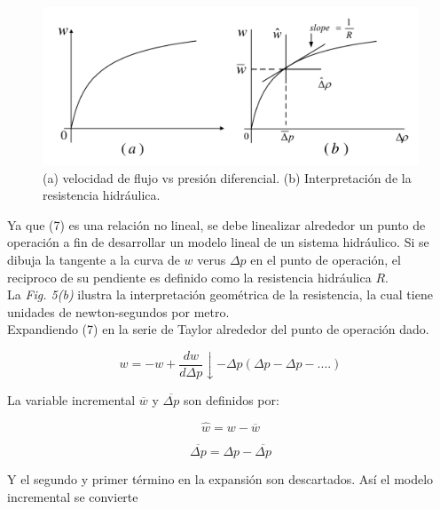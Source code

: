 \documentclass[a4paper,12pt,twoside]{proyectotanquesecci}
\begin{document}
\begin{figure}[h]
\centering
\includegraphics[scale=0.5]{Figura5}
\renewcommand{\figurename}{Fig.}
\caption{(a) velocidad de flujo vs presión diferencial. (b) Interpretación de la resistencia hidráulica.}
\label{(a) velocidad de flujo vs presión diferencial. (b) Interpretación de la resistencia hidráulica.}
\end{figure}

Ya que (7) es una relación no lineal, se debe linealizar alrededor un punto de operación a fin de desarrollar un modelo lineal de un sistema hidráulico.
Si se dibuja la tangente a la curva de $w$ verus $\Delta p$  en el punto de operación, el reciproco de su pendiente es definido como la resistencia hidráulica $R$. \\

La \textit{Fig. 5(b)} ilustra la interpretación geométrica de la resistencia, la cual tiene unidades de newton-segundos por metro.\\

Expandiendo (7) en la serie de Taylor alrededor del punto de operación dado.

\begin{equation}
w=-w+\frac{dw}{d\Delta p}\downarrow -\Delta p (\Delta p -\Delta p - ....)
\end{equation}

La variable incremental $\overline{w}$  y $\overline{\Delta p}$ son definidos por:

\begin{equation}
\widehat{w}=w-\overline{w}
\end{equation}

\begin{equation}
\overline{\Delta p}=\Delta p - \overline{\Delta p} 
\end{equation}

Y el segundo y primer término en la expansión son descartados. Así el modelo incremental se convierte
\end{document}
